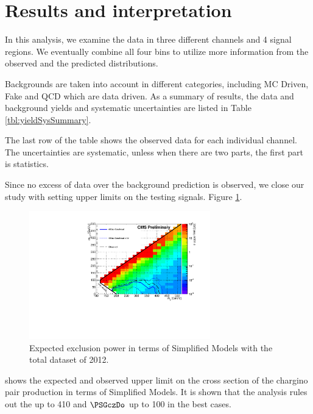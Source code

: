 \section{Results and interpretation}
\label{sect:stat}
In this analysis, we examine the data in three different channels and 4 signal regions.
We eventually combine all four bins to utilize more information from the observed and the predicted distributions.

Backgrounds are taken into account in different categories, including MC Driven, Fake and QCD which are data driven.
As a summary of results, the data and background yields and systematic uncertainties are listed in Table \ref{tbl:yieldSysSummary}. 

The last row of the table shows the observed data for  each individual channel.  The uncertainties are systematic, unless when there are 
two parts, the first part is statistics.

Since no excess of data over the background prediction is observed, 
we close our study with setting upper limits on the testing signals.
Figure \ref{fig:limit_final}. 
\begin{linenomath}
\begin{figure}[h]
\centering
\includegraphics[width=0.7\textwidth,keepaspectratio=true]{StatisticsFig/Exclusion4Bins.pdf}
\caption{Expected exclusion power in terms of Simplified Models
with the total dataset of 2012. 
}
\label{fig:limit_final}
\end{figure}
\end{linenomath}
shows the expected and observed upper limit on the cross section of the chargino pair production in terms of Simplified Models.%
It is shown that the analysis rules out the \chione up to 410 \GeV and  $\PSGczDo$ up to 100 \GeV in the best cases.


